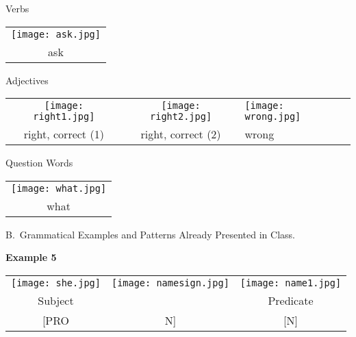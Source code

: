 \documentclass{tufte-book}
\begin{document}
\noindent Verbs

\begin{table}[h!]
\begin{tabular}{c}

\texttt{[image: ask.jpg]}\\
\footnotesize ask\\
\end{tabular}
\end{table}
\noindent Adjectives

\begin{table*}[h!]

\begin{tabular}{c c l }
\texttt{[image: right1.jpg]} & \texttt{[image: right2.jpg]} &\texttt{[image: wrong.jpg]} \\
\footnotesize right, correct (1) & \footnotesize right, correct (2) & \footnotesize wrong\\

\end{tabular}
\end{table*}
\newpage
\noindent Question Words

\begin{table}[h!]
\begin{tabular}{c}

\texttt{[image: what.jpg]}\\
\footnotesize what\\
\end{tabular}
\end{table}

\vspace{0.25cm}\noindent B.~Grammatical Examples and Patterns Already Presented in Class.

\vspace{0.25cm} \noindent \textbf{Example 5}
\begin{table*}[h!]

\begin{tabular}{c c | c}
\texttt{[image: she.jpg]} & \texttt{[image: namesign.jpg]} &\texttt{[image: name1.jpg]} \\
\footnotesize Subject &  & \footnotesize Predicate \\
\footnotesize [PRO & \footnotesize N] & \footnotesize [N] \\



\end{tabular}
\end{table*}
\end{document}
